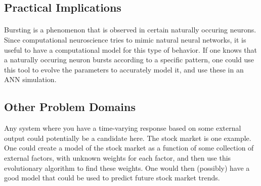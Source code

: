 \documentclass[a4paper,12pt]{article}
\begin{document}
\subsection{Practical Implications}
\paragraph{}Bursting is a phenomenon that is observed in certain naturally occuring neurons. Since computational neuroscience tries to mimic natural neural networks, it is useful to have a computational model for this type of behavior. If one knows that a naturally occuring neuron bursts according to a specific pattern, one could use this tool to evolve the parameters to accurately model it, and use these in an ANN simulation.

\subsection{Other Problem Domains}
Any system where you have a time-varying response based on some external output could potentially be a candidate here. The stock market is one example. One could create a model of the stock market as a function of some collection of external factors, with unknown weights for each factor, and then use this evolutionary algorithm to find these weights. One would then (possibly) have a good model that could be used to predict future stock market trends.
\end{document}
